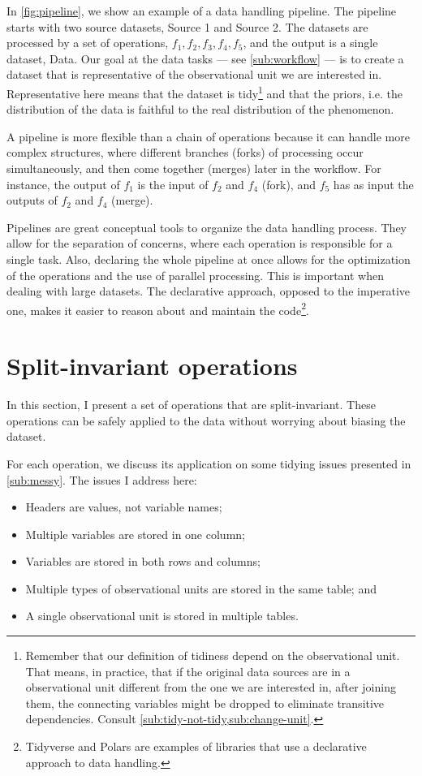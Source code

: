 In \cref{fig:pipeline}, we show an example of a data handling pipeline.  The pipeline
starts with two source datasets, Source 1 and Source 2.  The datasets are processed by a
set of operations, $f_1, f_2, f_3, f_4, f_5$, and the output is a single dataset,
Data.  Our goal at the data tasks --- see \cref{sub:workflow} --- is to create a dataset
that is representative of the observational unit we are interested in.  Representative
here means that the dataset is tidy\footnote{Remember that our definition of tidiness
depend on the observational unit.  That means, in practice, that if the original data
sources are in a observational unit different from the one we are interested in, after
joining them, the connecting variables might be dropped to eliminate transitive
dependencies.  Consult \cref{sub:tidy-not-tidy,sub:change-unit}.} and that the priors,
i.e. the distribution of the data is faithful to the real distribution of the phenomenon.

A pipeline is more flexible than a chain of operations because it can handle more complex
structures, where different branches (forks) of processing occur simultaneously, and then
come together (merges) later in the workflow.  For instance, the output of $f_1$ is the
input of $f_2$ and $f_4$ (fork), and $f_5$ has as input the outputs of $f_2$ and $f_4$
(merge).

Pipelines are great conceptual tools to organize the data handling process.  They allow
for the separation of concerns, where each operation is responsible for a single task.
Also, declaring the whole pipeline at once allows for the optimization of the operations
and the use of parallel processing.  This is important when dealing with large datasets.
The declarative approach, opposed to the imperative one, makes it easier to reason about
and maintain the code\footnote{Tidyverse and Polars are examples of
libraries that use a declarative approach to data handling.}.

\section{Split-invariant operations}

In this section, I present a set of operations that are split-invariant.  These operations
can be safely applied to the data without worrying about biasing the dataset.

For each operation, we discuss its application on some tidying issues presented in
\cref{sub:messy}.  The issues I address here:
\begin{itemize}
  \itemsep0em
  \item Headers are values, not variable names;
  \item Multiple variables are stored in one column; %
  \item Variables are stored in both rows and columns;
  \item Multiple types of observational units are stored in the same table; and %
  \item A single observational unit is stored in multiple tables.
\end{itemize}

